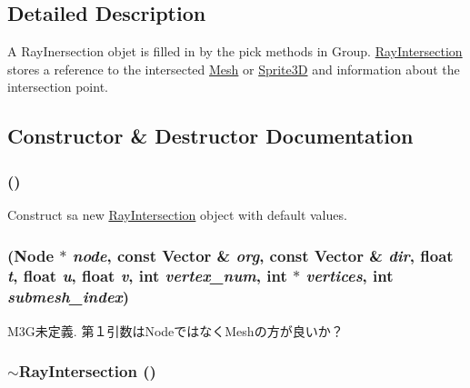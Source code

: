 \subsection{Detailed Description}
A RayInersection objet is filled in by the pick methods in Group. \hyperlink{classm3g_1_1RayIntersection}{RayIntersection} stores a reference to the intersected \hyperlink{classm3g_1_1Mesh}{Mesh} or \hyperlink{classm3g_1_1Sprite3D}{Sprite3D} and information about the intersection point. 

\subsection{Constructor \& Destructor Documentation}
\hypertarget{classm3g_1_1RayIntersection_242b33a79f98ed90ad5a36912d2a46d5}{
\subsubsection[{RayIntersection}]{ ()}}
\label{classm3g_1_1RayIntersection_242b33a79f98ed90ad5a36912d2a46d5}


Construct sa new \hyperlink{classm3g_1_1RayIntersection}{RayIntersection} object with default values. \hypertarget{classm3g_1_1RayIntersection_c7d946885706d0cefed30d9ee257a771}{
\subsubsection[{RayIntersection}]{ ({\bf Node} $\ast$ {\em node}, \/  const {\bf Vector} \& {\em org}, \/  const {\bf Vector} \& {\em dir}, \/  float {\em t}, \/  float {\em u}, \/  float {\em v}, \/  int {\em vertex\_\-num}, \/  int $\ast$ {\em vertices}, \/  int {\em submesh\_\-index})}}
\label{classm3g_1_1RayIntersection_c7d946885706d0cefed30d9ee257a771}


M3G未定義. 第１引数はNodeではなくMeshの方が良いか？ \hypertarget{classm3g_1_1RayIntersection_bf9eb45cc9ff31acd542bb0da1b46fe1}{
\subsubsection[{$\sim$RayIntersection}]{\setlength{\rightskip}{0pt plus 5cm}$\sim${\bf RayIntersection} ()}}
\label{classm3g_1_1RayIntersection_bf9eb45cc9ff31acd542bb0da1b46fe1}


